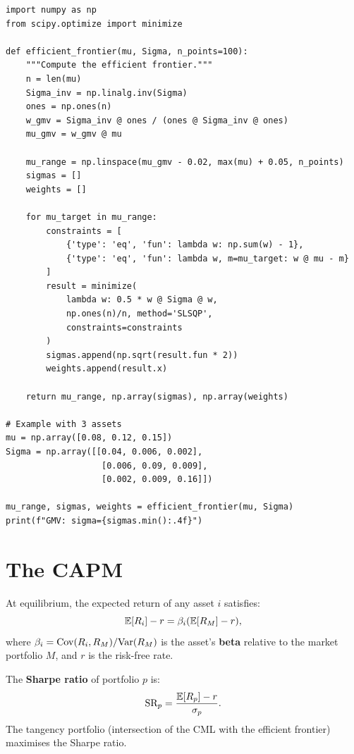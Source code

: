 \begin{codeblock}[title=\textbf{Markowitz Efficient Frontier}]
\begin{verbatim}
import numpy as np
from scipy.optimize import minimize

def efficient_frontier(mu, Sigma, n_points=100):
    """Compute the efficient frontier."""
    n = len(mu)
    Sigma_inv = np.linalg.inv(Sigma)
    ones = np.ones(n)
    w_gmv = Sigma_inv @ ones / (ones @ Sigma_inv @ ones)
    mu_gmv = w_gmv @ mu

    mu_range = np.linspace(mu_gmv - 0.02, max(mu) + 0.05, n_points)
    sigmas = []
    weights = []

    for mu_target in mu_range:
        constraints = [
            {'type': 'eq', 'fun': lambda w: np.sum(w) - 1},
            {'type': 'eq', 'fun': lambda w, m=mu_target: w @ mu - m}
        ]
        result = minimize(
            lambda w: 0.5 * w @ Sigma @ w,
            np.ones(n)/n, method='SLSQP',
            constraints=constraints
        )
        sigmas.append(np.sqrt(result.fun * 2))
        weights.append(result.x)

    return mu_range, np.array(sigmas), np.array(weights)

# Example with 3 assets
mu = np.array([0.08, 0.12, 0.15])
Sigma = np.array([[0.04, 0.006, 0.002],
                   [0.006, 0.09, 0.009],
                   [0.002, 0.009, 0.16]])

mu_range, sigmas, weights = efficient_frontier(mu, Sigma)
print(f"GMV: sigma={sigmas.min():.4f}")
\end{verbatim}
\end{codeblock}

\section{The CAPM}

\begin{theorem}
At equilibrium, the expected return of any asset $i$ satisfies:
\[
    \mathbb{E}[R_i] - r = \beta_i(\mathbb{E}[R_M] - r),
\]
where $\beta_i = \mathrm{Cov}(R_i, R_M)/\mathrm{Var}(R_M)$ is the asset's \textbf{beta}
relative to the market portfolio $M$, and $r$ is the risk-free rate.
\end{theorem}

\begin{definition}
The \textbf{Sharpe ratio} of portfolio $p$ is:
\[
    \text{SR}_p = \frac{\mathbb{E}[R_p] - r}{\sigma_p}.
\]
The tangency portfolio (intersection of the CML with the efficient frontier)
maximises the Sharpe ratio.
\end{definition}


